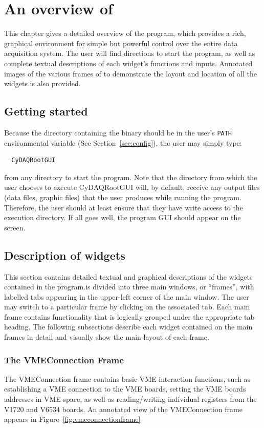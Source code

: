 \chapter{An overview of \ADAQ}
\label{chap:overview}
This chapter gives a detailed overview of the \ADAQ
program, which provides a rich, graphical environment for simple but
powerful control over the entire data acquisition system. The user
will find directions to start the program, as well as complete textual
descriptions of each widget's functions and inputs. Annotated images
of the various frames of \ADAQ to demonstrate the
layout and location of all the widgets is also provided.

\section{Getting started}
\label{sec:start}
Because the directory containing the \ADAQ binary
should be in the user's \texttt{PATH} environmental variable (See
Section~\ref{sec:config}), the user may simply type:
\begin{lstlisting}
  CyDAQRootGUI
\end{lstlisting}
from any directory to start the program. Note that the directory from
which the user chooses to execute CyDAQRootGUI will, by default,
receive any output files (data files, graphic files) that the user
produces while running the program. Therefore, the user should at
least ensure that they have write access to the execution directory.
If all goes well, the program GUI should appear on the screen.


\section{Description of \ADAQ widgets}
This section contains detailed textual and graphical descriptions of
the widgets contained in the program.\ADAQ is divided
into three main windows, or ``frames'', with labelled tabs appearing
in the upper-left corner of the main \ADAQ window. The
user may switch to a particular frame by clicking on the associated
tab. Each main frame contains functionality that is logically grouped
under the appropriate tab heading. The following subsections describe
each widget contained on the main frames in detail and visually show
the main layout of each frame.


\subsection{The VMEConnection Frame}
The VMEConnection frame contains basic VME interaction functions, such
as establishing a VME connection to the VME boards, setting the VME
boards addresses in VME space, as well as reading/writing individual
registers from the V1720 and V6534 boards. An annotated view of the
VMEConnection frame appears in Figure~\ref{fig:vmeconnectionframe}


